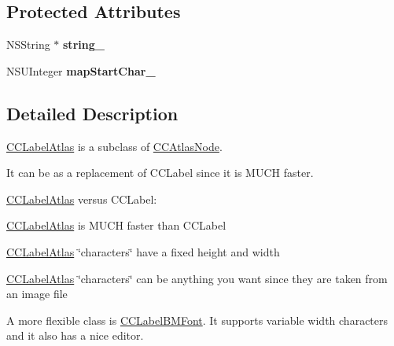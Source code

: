 \subsection*{Protected Attributes}
\begin{DoxyCompactItemize}
\item 
\hypertarget{interface_c_c_label_atlas_ae02d0917f19698fcb273bf079460d60b}{N\-S\-String $\ast$ {\bfseries string\-\_\-}}\label{interface_c_c_label_atlas_ae02d0917f19698fcb273bf079460d60b}

\item 
\hypertarget{interface_c_c_label_atlas_a3a9d769ff2ac0e10ce57ec7883100f0d}{N\-S\-U\-Integer {\bfseries map\-Start\-Char\-\_\-}}\label{interface_c_c_label_atlas_a3a9d769ff2ac0e10ce57ec7883100f0d}

\end{DoxyCompactItemize}


\subsection{Detailed Description}
\hyperlink{interface_c_c_label_atlas}{C\-C\-Label\-Atlas} is a subclass of \hyperlink{interface_c_c_atlas_node}{C\-C\-Atlas\-Node}.

It can be as a replacement of C\-C\-Label since it is M\-U\-C\-H faster.

\hyperlink{interface_c_c_label_atlas}{C\-C\-Label\-Atlas} versus C\-C\-Label\-:
\begin{DoxyItemize}
\item \hyperlink{interface_c_c_label_atlas}{C\-C\-Label\-Atlas} is M\-U\-C\-H faster than C\-C\-Label
\item \hyperlink{interface_c_c_label_atlas}{C\-C\-Label\-Atlas} \char`\"{}characters\char`\"{} have a fixed height and width
\item \hyperlink{interface_c_c_label_atlas}{C\-C\-Label\-Atlas} \char`\"{}characters\char`\"{} can be anything you want since they are taken from an image file
\end{DoxyItemize}

A more flexible class is \hyperlink{interface_c_c_label_b_m_font}{C\-C\-Label\-B\-M\-Font}. It supports variable width characters and it also has a nice editor. 

